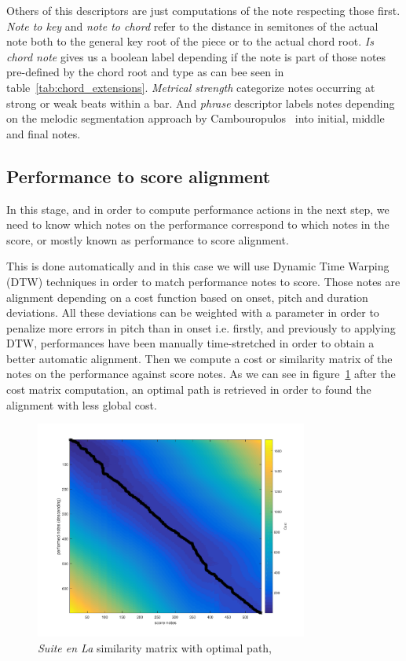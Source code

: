 \begin{itemize}
Others of this descriptors are just computations of the note respecting those first. \textit{Note to key} and \textit{note to chord} refer to the distance in semitones of the actual note both to the general key root of the piece or to the actual chord root. \textit{Is chord note} gives us a boolean label depending if the note is part of those notes pre-defined by the chord root and type as can bee seen in table~\ref{tab:chord_extensions}. \textit{Metrical strength} categorize notes occurring at strong or weak beats within a bar. And \textit{phrase} descriptor labels notes depending on the melodic segmentation approach by Cambouropulos~\cite{Cambouropoulos1997a} into initial, middle and final notes.

\end{itemize}



\subsection{Performance to score alignment}

In this stage, and in order to compute performance actions in the next step, we need to know which notes on the performance correspond to which notes in the score, or mostly known as performance to score alignment.

This is done automatically and in this case we will use Dynamic Time Warping (DTW) techniques in order to match performance notes to score. Those notes are alignment depending on a cost function based on onset, pitch and duration deviations. All these deviations can be weighted with a parameter in order to penalize more errors in pitch than in onset i.e. firstly, and previously to applying DTW, performances have been manually time-stretched in order to obtain a better automatic alignment. Then we compute a cost or similarity matrix of the notes on the performance against score notes. As we can see in figure~\ref{fig:suite_cost_matrix} after the cost matrix computation, an optimal path is retrieved in order to found the alignment with less global cost.

\begin{figure}[ht!]
\caption{\textit{Suite en La} similarity matrix with optimal path,}
\label{fig:suite_cost_matrix}
\centering
\includegraphics[width=0.8\textwidth]{Figures/Suite_en_la_cost.pdf}
\end{figure}

